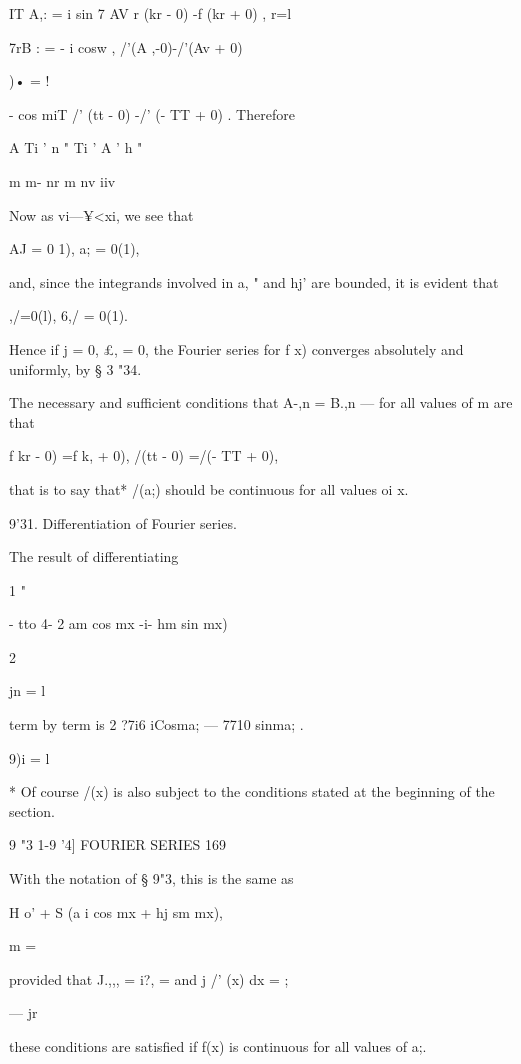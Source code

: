 IT A,: = i sin 7 AV   r (kr - 0) -f (kr + 0) , 
r=l 

7rB : = - i cosw , /'(A ,-0)-/'(Av + 0)  

)• = ! 

- cos miT  /' (tt - 0) -/' (- TT + 0) . 
Therefore 

A Ti ' n " Ti ' A ' h " 

m m- nr m nv iiv 

Now as vi—¥<xi, we see that 

AJ = 0 1), a; = 0(1), 

and, since the integrands involved in a, " and hj' are bounded, it is evident 
that 

 ,/=0(l), 6,/ = 0(1). 

Hence if   j = 0, £,  = 0, the Fourier series for f x) converges absolutely 
and uniformly, by § 3 "34. 

The necessary and sufficient conditions that A-,n = B.,n — for all values of 
m are that 

f kr - 0) =f k, + 0), /(tt - 0) =/(- TT + 0), 

that is to say that* /(a;) should be continuous for all values oi x. 

9'31. Differentiation of Fourier series. 

The result of differentiating 

1 " 

- tto 4- 2  am cos mx -i- hm sin mx) 



2 



jn = l 



term by term is 2  ?7i6 iCosma; — 7710  sinma; . 

9)i = l 

* Of course /(x) is also subject to the conditions stated at the beginning of the section. 



9 "3 1-9 '4] FOURIER SERIES 169 

With the notation of § 9"3, this is the same as 

H  o' + S (a i cos mx + hj sm mx), 

  m = \ 

provided that J.,,, = i?,  = and j /' (x) dx = ; 

— jr 

these conditions are satisfied if f(x) is continuous for all values of a;. 

